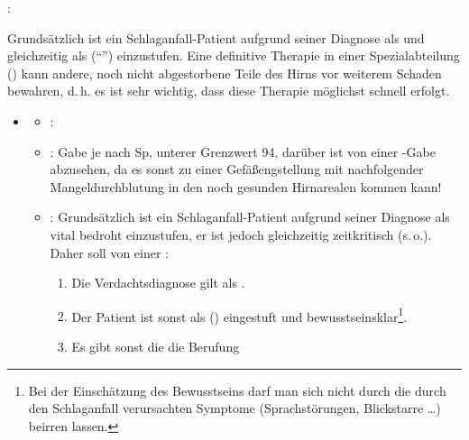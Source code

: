 \label{m:insult}
: 

Grundsätzlich
ist ein Schlaganfall-Patient aufgrund seiner Diagnose als  und gleichzeitig als 
(\enquote{}) einzustufen. 
Eine definitive Therapie in einer Spezialabteilung
() kann andere, noch nicht abgestorbene
Teile des Hirns vor weiterem Schaden bewahren, d.\,h. es ist
sehr wichtig, dass diese Therapie möglichst schnell
erfolgt.
% 


\begin{itemize}
  \item \TxMassVitMKBes
  \begin{itemize}
    \item {}: 
    \item {}: Gabe je nach Sp,
    unterer Grenzwert 94\PC*,
    darüber ist von einer -Gabe abzusehen, da es
    sonst zu einer Gefäßengstellung mit nachfolgender
    Mangeldurchblutung in den noch gesunden Hirnarealen
    kommen kann! 
    \item {}: Grundsätzlich ist ein
    Schlaganfall-Patient aufgrund seiner Diagnose als vital
    bedroht einzustufen, er ist jedoch gleichzeitig zeitkritisch (s.\,o.).
    Daher soll von einer
    :
    \begin{enumerate}
      \item Die Verdachtsdiagnose gilt als .
      \item Der Patient ist sonst als  () eingestuft
      und
      bewusstseinsklar\footnote{Bei der Einschätzung des Bewusstseins
      darf man sich nicht durch die durch den Schlaganfall
      verursachten Symptome (Sprachstörungen, Blickstarre \ldots)
      beirren lassen.}.
      \item Es gibt sonst  die die Berufung

\end{enumerate}
\end{itemize}
\end{itemize}
